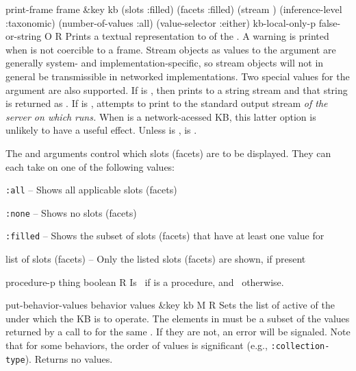 \begin{okbcop}{print-frame}{ frame \&key kb (slots :filled) (facets :filled) (stream \true) (inference-level :taxonomic) (number-of-values :all) (value-selector :either) kb-local-only-p} { false-or-string } { O } { R } {  }
Prints a textual representation to  of the
   .  A warning is printed when  is not
   coercible to a frame.  Stream objects as values to the 
   argument are generally system- and implementation-specific, so stream
   objects will not in general be
   transmissible in networked implementations.  Two special values for the
    argument are also supported.  If  is \false,
   then  prints to a string stream and
   that string is returned as .
   If  is \true,  attempts to print to the
   standard output stream {\em of the server on which} 
   {\em runs.}  When  is
   a network-acessed KB, this latter option is unlikely to have a useful
   effect.  Unless  is \false,  is
   \false.

   The  and  arguments control which slots (facets) 
   are to be displayed.  They can each take on one of the following values:
   \bitem
   \item {\tt :all} -- Shows all applicable slots (facets)
   \item {\tt :none} -- Shows no slots (facets)
   \item {\tt :filled} -- Shows the subset of slots (facets) that have at
   least one value for 
   \item list of slots (facets) -- Only the listed slots (facets) are shown,
   if present
   \eitem
\end{okbcop}

\begin{okbcfun}{procedure-p}{ thing} { boolean } {   } { R } {  }
Is \true\ if  is a procedure, and \false\ otherwise.
\end{okbcfun}

\begin{okbcop}{put-behavior-values}{ behavior values \&key kb} { \void } { M } { R } {  }
Sets the list of active  of the  under
   which the KB is to operate.  The elements in  must be a
   subset of the values returned by a call to
    for the same .
   If they are not, an  error will be signaled.
   Note that for some behaviors, the order of values is significant (e.g.,
    {\tt :collection-type}).  Returns no values.
\end{okbcop}

